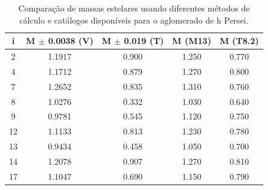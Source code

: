 \begin{table}[htbp]
\centering
\caption[Resultados de massas estelares para h Persei]{Comparação de massas estelares usando diferentes métodos de cálculo e catálogos disponíveis para o aglomerado de h Persei.}
\label{tab:hper_massas}
\begin{tabular}{ccccc}
\hline
{i} & {M $\pm$ 0.0038 (V)} & {M $\pm$ 0.019 (T)}  & {M (M13)} &  {M (T8.2)} \\ \hline
        2   & 1.1917 & 0.900 & 1.250 & 0.770 \\
		4   & 1.1712 & 0.879 & 1.270 & 0.800 \\
		7   & 1.2652 & 0.835 & 1.310 & 0.760 \\
		8   & 1.0276 & 0.332 & 1.030 & 0.640 \\
		9   & 0.9781 & 0.545 & 1.120 & 0.750 \\
		12  & 1.1133 & 0.813 & 1.230 & 0.780 \\
		13  & 0.9434 & 0.458 & 1.050 & 0.700 \\
		14  & 1.2078 & 0.907 & 1.270 & 0.810 \\
		17  & 1.1047 & 0.690 & 1.150 & 0.790 \\
        \hline
\end{tabular}
\end{table}
